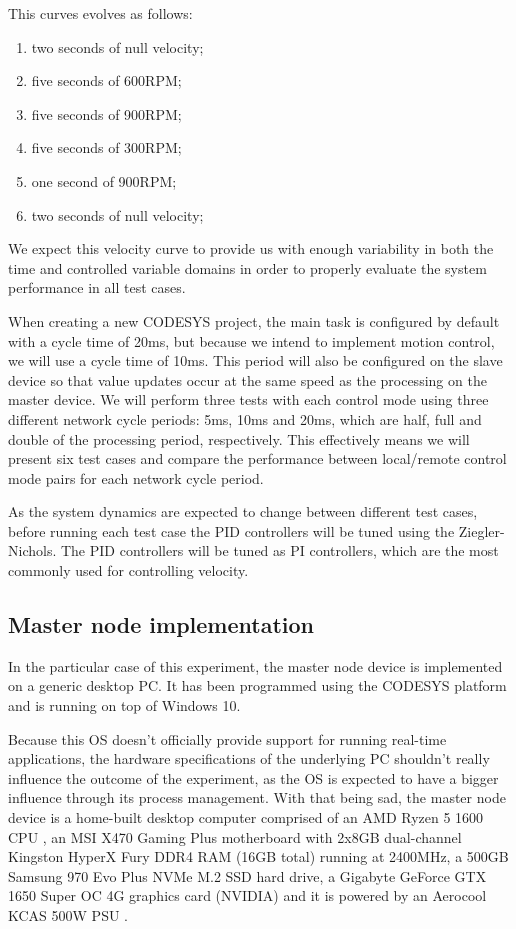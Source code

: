 This curves evolves as follows:
\begin{enumerate}
	\item two seconds of null velocity;
	\item five seconds of 600RPM;
	\item five seconds of 900RPM;
	\item five seconds of 300RPM;
	\item one second of 900RPM;
	\item two seconds of null velocity;
\end{enumerate}
We expect this velocity curve to provide us with enough variability in both the time and controlled variable domains in order to properly evaluate the system performance in all test cases.

When creating a new CODESYS project, the main task is configured by default with a cycle time of 20ms, but because we intend to implement motion control, we will use a cycle time of 10ms.
This period will also be configured on the slave device so that value updates occur at the same speed as the processing on the master device.
We will perform three tests with each control mode using three different network cycle periods: 5ms, 10ms and 20ms, which are half, full and double of the processing period, respectively.
This effectively means we will present six test cases and compare the performance between local/remote control mode pairs for each network cycle period.

As the system dynamics are expected to change between different test cases, before running each test case the PID controllers will be tuned using the Ziegler-Nichols.
The PID controllers will be tuned as PI controllers, which are the most commonly used for controlling velocity.

\subsection{Master node implementation}
In the particular case of this experiment, the master node device is implemented on a generic desktop PC.
It has been programmed using the CODESYS platform and is running on top of Windows 10\texttrademark{}.

Because this OS doesn't officially provide support for running real-time applications, the hardware specifications of the underlying PC shouldn't really influence the outcome of the experiment, as the OS is expected to have a bigger influence through its process management.
With that being sad, the master node device is a home-built desktop computer comprised of an AMD Ryzen\texttrademark{} 5 1600 CPU \cite{hdw:ryzen5-1600}, an MSI X470 Gaming Plus \cite{hdw:msi-x470} motherboard with 2x8GB dual-channel Kingston HyperX Fury DDR4 RAM (16GB total) \cite{hdw:hyperx-fury-8gb-ddr4-2400} running at 2400MHz, a 500GB Samsung 970 Evo Plus NVMe\textregistered{} M.2 SSD \cite{hdw:970evo-plus-ssd} hard drive, a Gigabyte GeForce\textregistered{} GTX 1650 Super\texttrademark{} OC 4G \cite{hdw:gigabyte-1650-super-oc} graphics card (NVIDIA) and it is powered by an Aerocool KCAS 500W PSU \cite{hdw:kcas-500w}.

